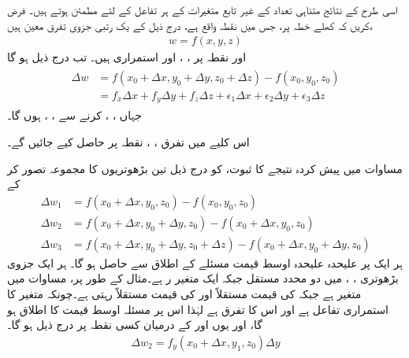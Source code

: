 اسی طرح کے نتائج متناہی تعداد کے  غیر تابع متغیرات کے ہر تفاعل کے لئے مطمئن ہوتے ہیں۔ فرض کریں   کہ کھلے خطہ پر، جس میں نقطہ    واقع  ہے،   درج ذیل کے یک رتبی جزوی تفرق معین ہیں،
\begin{align*}
w=f(x,y,z)
\end{align*}
اور  نقطہ   پر  ، ، اور  استمراری ہیں۔ تب درج ذیل ہو گا
\begin{gather}
\begin{aligned}\label{مساوات_ضمیمہ_یولر_پندرہ}
\Delta w&=f(x_0+\Delta x,y_0+\Delta y,z_0+\Delta z)-f(x_0,y_0,z_0)\\
&=f_x\Delta x+f_y\Delta y +f_z\Delta z+\epsilon_1\Delta x+\epsilon_2\Delta y+\epsilon_3\Delta z
\end{aligned}
\end{gather}
جہاں  ، ،  کرنے سے ، ،   ہوں  گا۔

اس کلیے میں تفرق ، ،  نقطہ  پر حاصل کیے جائیں گے۔

مساوات  میں پیش کردہ  نتیجے کا ثبوت،  کو  درج ذیل  تین بڑھوتریوں کا مجموعہ تصور کر کے
\begin{align}
\Delta w_1&=f(x_0+\Delta x,y_0,z_0)-f(x_0,y_0,z_0)\label{مساوات_ضمیمہ_بڑھوتری_ایک}\\
\Delta w_2&=f(x_0+\Delta x,y_0+\Delta y,z_0)-f(x_0+\Delta x,y_0,z_0)\label{مساوات_ضمیمہ_بڑھوتری_دو}\\
\Delta w_3&=f(x_0+\Delta x,y_0+\Delta y, z_0+\Delta z)-f(x_0+\Delta x,y_0+\Delta y,z_0)\label{مساوات_ضمیمہ_بڑھوتری_تین}
\end{align}
ہر ایک پر علیحدہ علیحدہ اوسط قیمت مسئلے کے اطلاق سے حاصل   ہو گا۔  ہر ایک جزوی بڑھوتری ، ،  میں دو محدد مستقل جبکہ    ایک متغیر ر ہے۔مثال کے طور پر،  مساوات  میں  متغیر ہے جبکہ  کی قیمت مستقلاً    اور  کی قیمت  مستقلاً  رہتی ہے۔چونکہ  متغیر  کا  استمراری تفاعل ہے اور اس کا تفرق  ہے لہٰذا اس پر مسئلہ اوسط قیمت کا اطلاق ہو گا، اور یوں  اور  کے درمیان کسی نقطہ  پر درج ذیل ہو گا۔
\begin{align*}
\Delta w_2=f_y(x_0+\Delta x,y_1,z_0)\Delta y
\end{align*}
